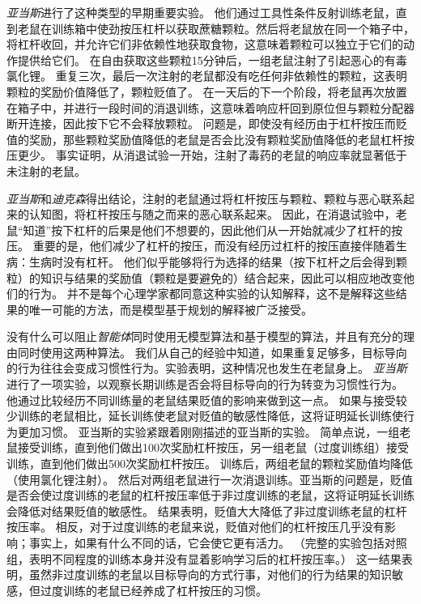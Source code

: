 \textit{亚当斯}\cite{adams1981instrumental}进行了这种类型的早期重要实验。
他们通过工具性条件反射训练老鼠，直到老鼠在训练箱中使劲按压杠杆以获取蔗糖颗粒。然后将老鼠放在同一个箱子中，将杠杆收回，并允许它们非依赖性地获取食物，这意味着颗粒可以独立于它们的动作提供给它们。
在自由获取这些颗粒15分钟后，一组老鼠注射了引起恶心的有毒氯化锂。
重复三次，最后一次注射的老鼠都没有吃任何非依赖性的颗粒，这表明颗粒的奖励价值降低了，颗粒贬值了。
在一天后的下一个阶段，将老鼠再次放置在箱子中，并进行一段时间的消退训练，这意味着响应杆回到原位但与颗粒分配器断开连接，因此按下它不会释放颗粒。
问题是，即使没有经历由于杠杆按压而贬值的奖励，那些颗粒奖励值降低的老鼠是否会比没有颗粒奖励值降低的老鼠杠杆按压更少。
事实证明，从消退试验一开始，注射了毒药的老鼠的响应率就显著低于未注射的老鼠。


\textit{亚当斯}和\textit{迪克森}得出结论，注射的老鼠通过将杠杆按压与颗粒、颗粒与恶心联系起来的认知图，将杠杆按压与随之而来的恶心联系起来。
因此，在消退试验中，老鼠“知道”按下杠杆的后果是他们不想要的，因此他们从一开始就减少了杠杆的按压。
重要的是，他们减少了杠杆的按压，而没有经历过杠杆的按压直接伴随着生病：生病时没有杠杆。
他们似乎能够将行为选择的结果（按下杠杆之后会得到颗粒）的知识与结果的奖励值（颗粒是要避免的）结合起来，因此可以相应地改变他们的行为。
并不是每个心理学家都同意这种实验的认知解释，这不是解释这些结果的唯一可能的方法，而是模型基于规划的解释被广泛接受。


没有什么可以阻止\textit{智能体}同时使用无模型算法和基于模型的算法，并且有充分的理由同时使用这两种算法。
我们从自己的经验中知道，如果重复足够多，目标导向的行为往往会变成习惯性行为。实验表明，这种情况也发生在老鼠身上。
\textit{亚当斯}\cite{adams1982variations}进行了一项实验，以观察长期训练是否会将目标导向的行为转变为习惯性行为。
他通过比较经历不同训练量的老鼠结果贬值的影响来做到这一点。
如果与接受较少训练的老鼠相比，延长训练使老鼠对贬值的敏感性降低，这将证明延长训练使行为更加习惯。
亚当斯的实验紧跟着刚刚描述的亚当斯\cite{adams1981instrumental}的实验。
简单点说，一组老鼠接受训练，直到他们做出100次奖励杠杆按压，另一组老鼠（过度训练组）接受训练，直到他们做出500次奖励杠杆按压。
训练后，两组老鼠的颗粒奖励值均降低（使用氯化锂注射）。
然后对两组老鼠进行一次消退训练。亚当斯的问题是，贬值是否会使过度训练的老鼠的杠杆按压率低于非过度训练的老鼠，这将证明延长训练会降低对结果贬值的敏感性。
结果表明，贬值大大降低了非过度训练老鼠的杠杆按压率。
相反，对于过度训练的老鼠来说，贬值对他们的杠杆按压几乎没有影响；事实上，如果有什么不同的话，它会使它更有活力。
（完整的实验包括对照组，表明不同程度的训练本身并没有显着影响学习后的杠杆按压率。）
这一结果表明，虽然非过度训练的老鼠以目标导向的方式行事，对他们的行为结果的知识敏感，但过度训练的老鼠已经养成了杠杆按压的习惯。



